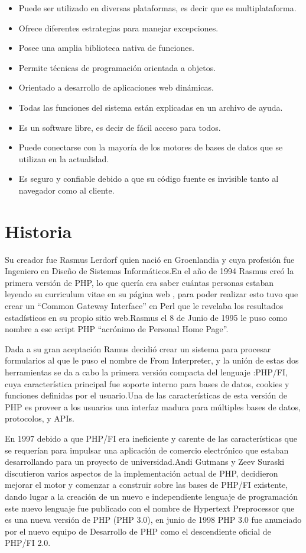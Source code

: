 \documentclass[11pt]{article} %
\begin{document}
\begin{itemize}
\item Puede ser utilizado  en diversas plataformas, es decir que es multiplataforma.
\item Ofrece diferentes estrategias para manejar excepciones.
\item Posee una amplia biblioteca nativa de funciones.
\item Permite técnicas de programación orientada a objetos.
\item Orientado a desarrollo de aplicaciones web dinámicas.
\item Todas las funciones del sistema están explicadas en un  archivo de ayuda.
\item Es un software libre, es decir de fácil acceso para todos.
\item Puede conectarse con la mayoría de los motores de bases de datos que se utilizan en la actualidad.
\item Es seguro y confiable debido a que su código fuente es invisible tanto al navegador como al cliente.
\end {itemize}

\section{Historia}

Su creador fue  Rasmus  Lerdorf  quien nació en  Groenlandia  y cuya  profesión fue Ingeniero en Diseño de Sistemas Informáticos.En el año de 1994 Rasmus creó la primera versión de PHP, lo que quería era saber cuántas personas estaban leyendo su curriculum vitae en 
su página web , para poder realizar esto tuvo que crear  un   ``Common Gateway Interface'' en  Perl  que le revelaba  los resultados estadísticos en su propio sitio web.Rasmus el 8 de Junio de 1995 le puso como nombre a ese script PHP  ``acrónimo de Personal Home Page''.

Dada a su gran aceptación Ramus decidió crear  un sistema para procesar formularios al que le puso el nombre de From Interpreter, y la unión de estas dos herramientas  se da  a cabo  la primera versión compacta del lenguaje :PHP/FI, cuya característica principal fue soporte interno para bases de datos, cookies y funciones definidas por el usuario.Una de las características de esta versión de PHP es proveer a los usuarios  una interfaz madura para múltiples bases de datos, protocolos, y APIs.

En 1997 debido a que PHP/FI era ineficiente y carente de las características que se requerían para impulsar una aplicación de comercio electrónico que estaban desarrollando para un proyecto de universidad.Andi Gutmans y Zeev Suraski discutieron varios aspectos de la implementación actual de PHP, decidieron mejorar el motor y comenzar a construir sobre las bases de PHP/FI existente, dando lugar a la creación de un nuevo e independiente lenguaje de programación este nuevo lenguaje fue publicado con el nombre de Hypertext  Preprocessor que es una nueva versión de PHP (PHP 3.0), en junio de 1998  PHP 3.0 fue anunciado por el nuevo equipo de Desarrollo de PHP como el descendiente oficial de PHP/FI 2.0.
\end{document}
